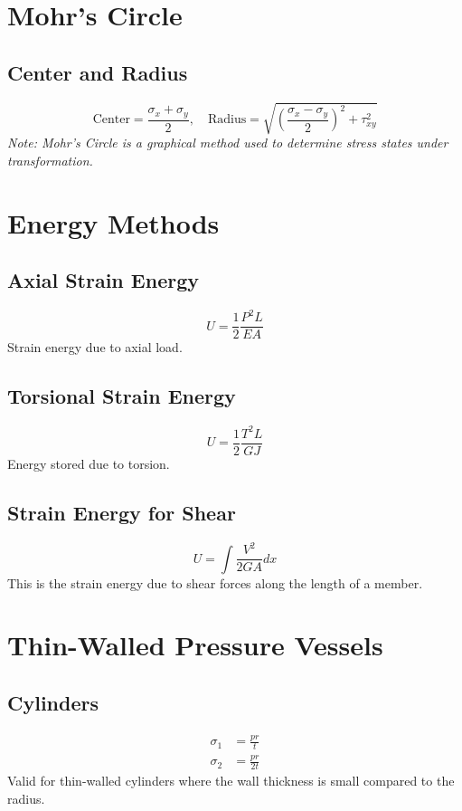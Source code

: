 \documentclass[12pt]{article}
\begin{document}
\section{Mohr's Circle}
\subsection{Center and Radius}
\begin{equation}
\text{Center} = \frac{\sigma_x + \sigma_y}{2}, \quad \text{Radius} = \sqrt{\left(\frac{\sigma_x - \sigma_y}{2}\right)^2 + \tau_{xy}^2}
\end{equation}
\textit{Note: Mohr's Circle is a graphical method used to determine stress states under transformation.}

\section{Energy Methods}
\subsection{Axial Strain Energy}
\begin{equation}
U = \frac{1}{2} \frac{P^2 L}{E A}
\end{equation}
Strain energy due to axial load.

\subsection{Torsional Strain Energy}
\begin{equation}
U = \frac{1}{2} \frac{T^2 L}{G J}
\end{equation}
Energy stored due to torsion.

\subsection{Strain Energy for Shear}
\begin{equation}
U = \int \frac{V^2}{2 G A} dx
\end{equation}
This is the strain energy due to shear forces along the length of a member.

\section{Thin-Walled Pressure Vessels}
\subsection{Cylinders}
\begin{align}
\sigma_1 &= \frac{p r}{t} \\
\sigma_2 &= \frac{p r}{2t}
\end{align}
Valid for thin-walled cylinders where the wall thickness is small compared to the radius.
\end{document}
